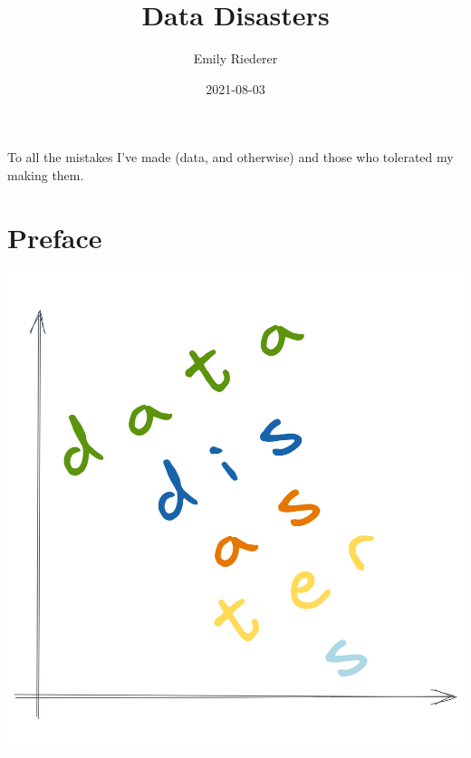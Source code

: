 \documentclass[
]{krantz}
\title{Data Disasters}
\author{Emily Riederer}
\date{2021-08-03}
\begin{document}
\maketitle


\thispagestyle{empty}

\begin{center}
To all the mistakes I've made (data, and otherwise) and those who tolerated my making them.
\end{center}

\setlength{\abovedisplayskip}{-5pt}
\setlength{\abovedisplayshortskip}{-5pt}

{
\hypersetup{linkcolor=}
\setcounter{tocdepth}{2}
\tableofcontents
}
\listoftables
\listoffigures
\hypertarget{preface}{%
\chapter*{Preface}\label{preface}}


\begin{center}\includegraphics[width=0.9\linewidth]{figures/cover} \end{center}
\end{document}
